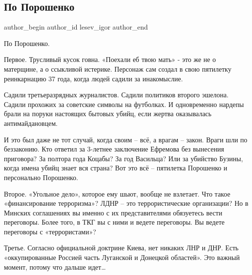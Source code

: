  
 
 
 
 
 
\subsection{По Порошенко}
\label{sec:21_12_2021.fb.lesev_igor.1.po_poroshenko}
 
\ifcmt
 author_begin
   author_id lesev_igor
 author_end
\fi

По Порошенко.

Первое. Трусливый кусок говна. «Поехали еб твою мать» - это же не о матерщине,
а о ссыкливой истерике. Персонаж сам создал в свою пятилетку реинкарнацию 37
года, когда людей садили за инакомыслие.


Садили третьеразрядных журналистов. Садили политиков второго эшелона. Садили
прохожих за советские символы на футболках. И одновременно нардепы брали на
поруки настоящих бытовых убийц, если жертва оказывалась антимайдановцем.

И это был даже не тот случай, когда своим – всё, а врагам – закон. Враги шли по
беззаконию. Кто ответил за 3-летнее заключение Ефремова без вынесения
приговора? За полтора года Коцабы? За год Васильца? Или за убийство Бузины,
когда имена убийц знает вся страна? Вот это всё – пятилетка Порошенко и
персонально Порошенко.

Второе. «Угольное дело», которое ему шьют, вообще не взлетает. Что такое
«финансирование терроризма»? ЛДНР – это террористические организации? Но в
Минских соглашениях вы именно с их представителями обязуетесь вести переговоры.
Более того, в ТКГ вы с ними и ведете переговоры. Вы ведете переговоры с
«террористами»?

Третье. Согласно официальной доктрине Киева, нет никаких ЛНР и ДНР. Есть
«оккупированные Россией часть Луганской и Донецкой областей». Это важный
момент, потому что дальше идет…

